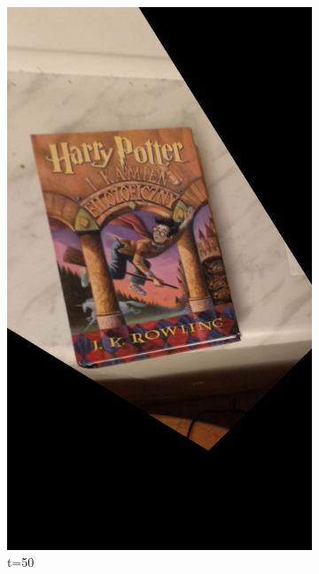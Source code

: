 \documentclass{article}
\begin{document}
\begin{figure}[H]
\begin{subfigure}[b]{0.3\linewidth}
			\includegraphics[width=\linewidth]{p50t.png}
			\caption{t=50}
		\end{subfigure}
		\begin{subfigure}[b]{0.3\linewidth}

\end{subfigure}
\end{figure}
\end{document}

